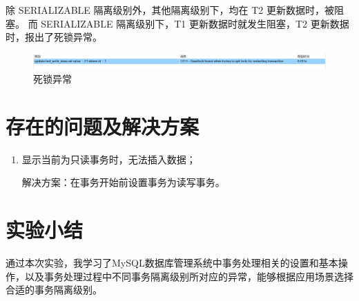 \documentclass{article}
\begin{document}
除 SERIALIZABLE 隔离级别外，其他隔离级别下，均在 T2 更新数据时，被阻塞。
而 SERIALIZABLE 隔离级别下，T1 更新数据时就发生阻塞，T2 更新数据时，报出了死锁异常。

\begin{figure}[H]
\centering
\includegraphics[width=\textwidth]{img/64.png}
\caption{死锁异常}
\end{figure}
\begin{table}[h!]
  \centering
  \caption{Isolation Levels and Anomalies}
  \label{table:isolation_anomalies}
\end{table}


\section{存在的问题及解决方案}

\begin{enumerate}
  \item 显示当前为只读事务时，无法插入数据；
  
  解决方案：在事务开始前设置事务为读写事务。
\end{enumerate}


\section{实验小结}

通过本次实验，我学习了MySQL数据库管理系统中事务处理相关的设置和基本操作，以及事务处理过程中不同事务隔离级别所对应的异常，能够根据应用场景选择合适的事务隔离级别。
\end{document}
